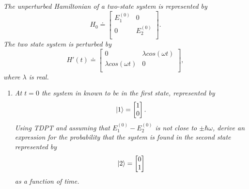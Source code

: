 \begin{example}
	\emph{The unperturbed Hamiltonian of a two-state system is represented by}
	\begin{equation}
		H_0\doteq\begin{bmatrix}
			E_1^{(0)} & 0\\
			0 & E_2^{(0)} \\ 
		\end{bmatrix}.
	\end{equation} 
	\emph{The two state system is perturbed by}
	\begin{equation}
		H'(t)\doteq\begin{bmatrix}
			0 & \lambda cos(\omega t)\\
			\lambda cos(\omega t) & 0 \\ 
		\end{bmatrix},
	\end{equation} 
	\emph{where $\lambda$ is real.} \newline
	
	\begin{enumerate}
		\item \emph{At $t=0$ the system in known to be in the first state, represented by}
		\begin{equation}
			\ket{1}=\begin{bmatrix}
				1\\
				0 \\ 
			\end{bmatrix}.
		\end{equation} 
		\emph{Using TDPT and assuming that $E_1^{(0)}-E_2^{(0)}$ is not close to $\pm \hbar \omega$, derive an expression for the probability that the system is found in the second state represented by}
		\begin{equation}
			\ket{2}=\begin{bmatrix}
				0\\
				1 \\ 
			\end{bmatrix}
		\end{equation} 
		\emph{as a function of time.}\newline
		

\end{enumerate}
\end{example}
